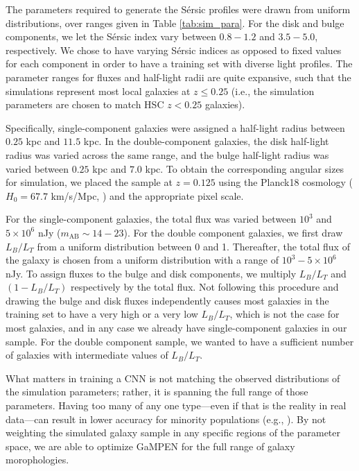 \documentclass[twocolumn]{aastex63}
\newcommand\sersic{S\'ersic}
\newcommand\gampen{GaMPEN}
\begin{document}
\begin{CJK*}{UTF8}{gbsn}
The parameters required to generate the \sersic{} profiles were drawn from uniform distributions, over ranges given in Table \ref{tab:sim_para}. For the disk and bulge components, we let the \sersic{} index vary between $0.8-1.2$ and $3.5-5.0$, respectively. We chose to have varying \sersic{} indices as opposed to fixed values for each component in order to have a training set with diverse light profiles. The parameter ranges for fluxes and half-light radii are quite expansive, such that the simulations represent most local galaxies \citep{binney_and_merrifield} at $z \leq 0.25$ (i.e., the simulation parameters are chosen to match HSC $z < 0.25$ galaxies).

Specifically, single-component galaxies were assigned a half-light radius between $0.25$ kpc and $11.5$ kpc. In the double-component galaxies, the disk half-light radius was varied across the same range, and the bulge half-light radius was varied between $0.25$ kpc and $7.0$ kpc. To obtain the corresponding angular sizes for simulation, we placed the sample at $ z = 0.125$ using the Planck18 cosmology ($H_0=67.7$ km/s/Mpc, \citealp{planck18}) and the appropriate pixel scale.

For the single-component galaxies, the total flux was varied between $10^3$ and $5\times10^6$ nJy ($m_{\mathrm{AB}}\sim14 - 23$). For the double component galaxies, we first draw $L_B/L_T$ from a uniform distribution between 0 and 1. Thereafter, the total flux of the galaxy is chosen from a uniform distribution with a range of $10^3 - 5\times10^6$ nJy. To assign fluxes to the bulge and disk components, we multiply $L_B/L_T$ and $(1 - L_B/L_T)$ respectively by the total flux. Not following this procedure and drawing the bulge and disk fluxes independently causes most galaxies in the training set to have a very high or a very low $L_B/L_T$, which is not the case for most galaxies, and in any case we already have single-component galaxies in our sample. For the double component sample, we wanted to have a sufficient number of galaxies with intermediate values of $L_B/L_T$.

What matters in training a CNN is not matching the observed distributions of the simulation parameters; rather, it is spanning the full range of those parameters. 
Having too many of any one type---even if that is the reality in real data---can result in lower accuracy for minority populations (e.g., \citealp{Ghosh2020GalaxyGalaxies}).
By not weighting the simulated galaxy sample in any specific regions of the parameter space, we are able to optimize \gampen{} for the full range of galaxy morophologies.


\end{CJK*}
\end{document}
